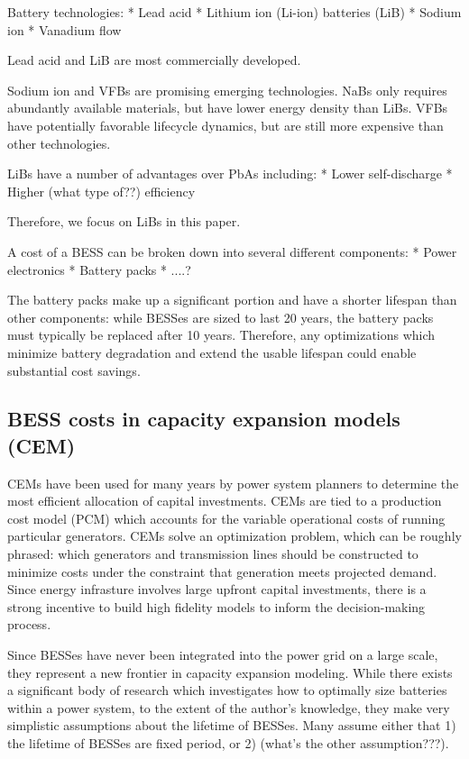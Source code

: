 Battery technologies:
* Lead acid 
* Lithium ion (Li-ion) batteries (LiB)
* Sodium ion
* Vanadium flow

Lead acid and LiB are most commercially developed. 

Sodium ion and VFBs are promising emerging technologies. NaBs only requires abundantly available materials, but have lower energy density than LiBs. VFBs have potentially favorable lifecycle dynamics, but are still more expensive than other technologies.

LiBs have a number of advantages over PbAs including:
* Lower self-discharge
* Higher (what type of??) efficiency

Therefore, we focus on LiBs in this paper.

A cost of a BESS can be broken down into several different components:
* Power electronics
* Battery packs
* ....?

The battery packs make up a significant portion and have a shorter lifespan than other components: while BESSes are sized to last 20 years, the battery packs must typically be replaced after 10 years. Therefore, any optimizations which minimize battery degradation and extend the usable lifespan could enable substantial cost savings.

\subsection{BESS costs in capacity expansion models (CEM)}

CEMs have been used for many years by power system planners to determine the most efficient allocation of capital investments. CEMs are tied to a production cost model (PCM) which accounts for the variable operational costs of running particular generators. CEMs solve an optimization problem, which can be roughly phrased: which generators and transmission
lines should be constructed to minimize costs under the constraint that generation meets projected demand.
Since energy infrasture involves large upfront capital investments, there is a strong incentive to build high fidelity models to inform the decision-making process.

Since BESSes have never been integrated into the power grid on a large scale, they represent a new frontier in capacity expansion modeling.
While there exists a significant body of research which investigates how to optimally size batteries within a power system, to the extent of the author's knowledge, they make very simplistic assumptions
about the lifetime of BESSes. Many assume either that 1) the lifetime of BESSes are fixed period, or 2) (what's the other assumption???). 

